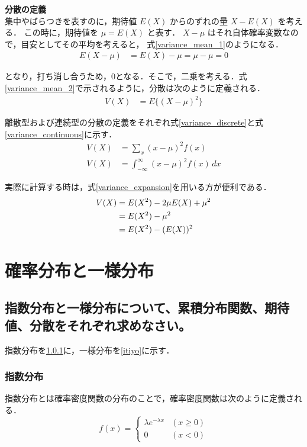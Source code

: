 \documentclass[titlepage,a4paper]{jsarticle}
\begin{document}
\textbf{分散の定義}\\
集中やばらつきを表すのに，期待値 \( E(X) \) からのずれの量 \( X - E(X) \) を考える．
この時に，期待値を \( \mu = E(X) \) と表す．
\( X - \mu \) はそれ自体確率変数なので，目安としてその平均を考えると，
式\eqref{variance_mean_1}のようになる．
\begin{align}
  E(X - \mu) & = E(X) - \mu = \mu - \mu = 0 \label{variance_mean_1}
\end{align}

となり，打ち消し合うため，0となる．そこで，二乗を考える．式\eqref{variance_mean_2}で示されるように，分散は次のように定義される．
\begin{align}
  V(X) & = E\{(X - \mu)^2\} \label{variance_mean_2}
\end{align}

離散型および連続型の分散の定義をそれぞれ式\eqref{variance_discrete}と式\eqref{variance_continuous}に示す．
\begin{align}
  V(X) & = \sum_x (x - \mu)^2 f(x) \label{variance_discrete}                        \\
  V(X) & = \int_{-\infty}^\infty (x - \mu)^2 f(x) \, dx \label{variance_continuous}
\end{align}

実際に計算する時は，式\eqref{variance_expansion}を用いる方が便利である．
\begin{align}
  V(X) & = E(X^2) - 2\mu E(X) + \mu^2 \notag            \\
       & = E(X^2) - \mu^2 \notag                        \\
       & = E(X^2) - (E(X))^2 \label{variance_expansion}
\end{align}


\section{確率分布と一様分布}%
\subsection*{指数分布と一様分布について、累積分布関数、期待値、分散をそれぞれ求めなさい。}
指数分布を\ref{sisu}に，一様分布を\ref{itiyo}に示す．
\subsubsection{指数分布}\label{sisu}
指数分布とは確率密度関数の分布のことで，確率密度関数は次のように定義される．
\[
  f(x) =
  \begin{cases}
    \lambda e^{-\lambda x} & (x \geq 0) \\
    0                      & (x < 0)
  \end{cases}
\]
\end{document}
